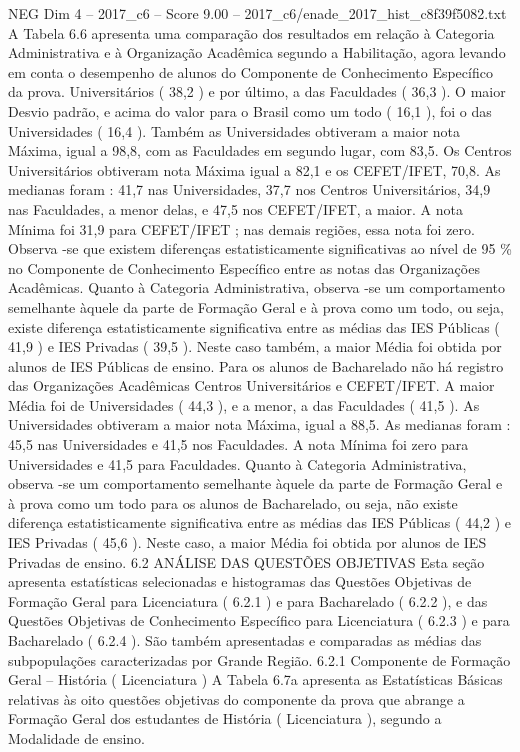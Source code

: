 \begin{textsample}{NEG Dim 4 – 2017\_c6 – Score 9.00 – 2017\_c6/enade\_2017\_hist\_c8f39f5082.txt}
A Tabela 6.6 apresenta uma comparação dos resultados em relação à Categoria Administrativa e à Organização Acadêmica segundo a Habilitação, agora levando em conta o desempenho de alunos do Componente de Conhecimento Específico da prova.
Universitários ( 38,2 ) e por último, a das Faculdades ( 36,3 ).
O maior Desvio padrão, e acima do valor para o Brasil como um todo ( 16,1 ), foi o das Universidades ( 16,4 ).
Também as Universidades obtiveram a maior nota Máxima, igual a 98,8, com as Faculdades em segundo lugar, com 83,5.
Os Centros Universitários obtiveram nota Máxima igual a 82,1 e os CEFET/IFET, 70,8.
As medianas foram : 41,7 nas Universidades, 37,7 nos Centros Universitários, 34,9 nas Faculdades, a menor delas, e 47,5 nos CEFET/IFET, a maior.
A nota Mínima foi 31,9 para CEFET/IFET ; nas demais regiões, essa nota foi zero.
Observa -se que existem diferenças estatisticamente significativas ao nível de 95 \% no Componente de Conhecimento Específico entre as notas das Organizações Acadêmicas.
Quanto à Categoria Administrativa, observa -se um comportamento semelhante àquele da parte de Formação Geral e à prova como um todo, ou seja, existe diferença estatisticamente significativa entre as médias das IES Públicas ( 41,9 ) e IES Privadas ( 39,5 ).
Neste caso também, a maior Média foi obtida por alunos de IES Públicas de ensino.
Para os alunos de Bacharelado não há registro das Organizações Acadêmicas Centros Universitários e CEFET/IFET.
A maior Média foi de Universidades ( 44,3 ), e a menor, a das Faculdades ( 41,5 ).
As Universidades obtiveram a maior nota Máxima, igual a 88,5.
As medianas foram : 45,5 nas Universidades e 41,5 nos Faculdades.
A nota Mínima foi zero para Universidades e 41,5 para Faculdades.
Quanto à Categoria Administrativa, observa -se um comportamento semelhante àquele da parte de Formação Geral e à prova como um todo para os alunos de Bacharelado, ou seja, não existe diferença estatisticamente significativa entre as médias das IES Públicas ( 44,2 ) e IES Privadas ( 45,6 ).
Neste caso, a maior Média foi obtida por alunos de IES Privadas de ensino. 6.2 ANÁLISE DAS QUESTÕES OBJETIVAS Esta seção apresenta estatísticas selecionadas e histogramas das Questões Objetivas de Formação Geral para Licenciatura ( 6.2.1 ) e para Bacharelado ( 6.2.2 ), e das Questões Objetivas de Conhecimento Específico para Licenciatura ( 6.2.3 ) e para Bacharelado ( 6.2.4 ).
São também apresentadas e comparadas as médias das subpopulações caracterizadas por Grande Região. 6.2.1 Componente de Formação Geral – História ( Licenciatura ) A Tabela 6.7a apresenta as Estatísticas Básicas relativas às oito questões objetivas do componente da prova que abrange a Formação Geral dos estudantes de História ( Licenciatura ), segundo a Modalidade de ensino.

\end{textsample}
